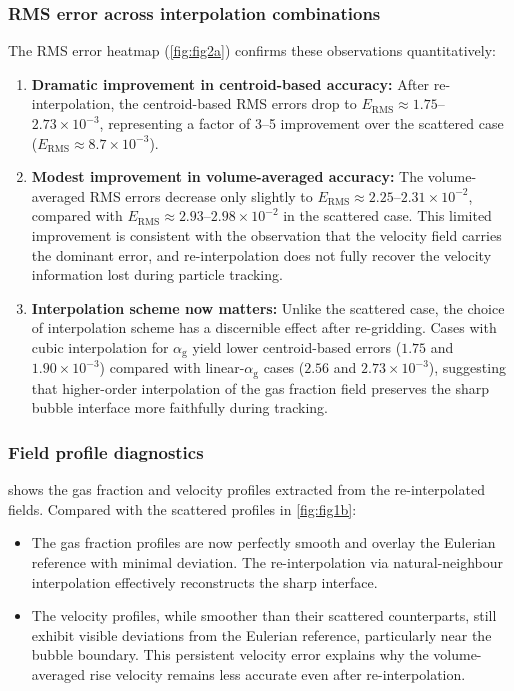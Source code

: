\documentclass[11pt,a4paper]{article}
\newcommand{\alphag}{\alpha_{\mathrm{g}}}
\newcommand{\ERMS}{E_{\mathrm{RMS}}}
\begin{document}
\subsubsection{RMS error across interpolation combinations}

The RMS error heatmap (\cref{fig:fig2a}) confirms these observations
quantitatively:

\begin{enumerate}[label=(\arabic*)]
  \item \textbf{Dramatic improvement in centroid-based accuracy:} After
    re-interpolation, the centroid-based RMS errors drop to
    $\ERMS \approx 1.75$--$2.73 \times 10^{-3}$, representing a factor of
    3--5 improvement over the scattered case
    ($\ERMS \approx 8.7 \times 10^{-3}$).
  \item \textbf{Modest improvement in volume-averaged accuracy:} The
    volume-averaged RMS errors decrease only slightly to
    $\ERMS \approx 2.25$--$2.31 \times 10^{-2}$, compared with
    $\ERMS \approx 2.93$--$2.98 \times 10^{-2}$ in the scattered case.
    This limited improvement is consistent with the observation that the
    velocity field carries the dominant error, and re-interpolation does not
    fully recover the velocity information lost during particle tracking.
  \item \textbf{Interpolation scheme now matters:} Unlike the scattered
    case, the choice of interpolation scheme has a discernible effect after
    re-gridding.  Cases with cubic interpolation for $\alphag$ yield lower
    centroid-based errors ($1.75$ and $1.90 \times 10^{-3}$) compared with
    linear-$\alphag$ cases ($2.56$ and $2.73 \times 10^{-3}$), suggesting
    that higher-order interpolation of the gas fraction field preserves the
    sharp bubble interface more faithfully during tracking.
\end{enumerate}

\subsubsection{Field profile diagnostics}

 shows the gas fraction and velocity profiles extracted from
the re-interpolated fields.  Compared with the scattered profiles in
\cref{fig:fig1b}:

\begin{itemize}
  \item The gas fraction profiles are now perfectly smooth and overlay the
    Eulerian reference with minimal deviation.  The re-interpolation via
    natural-neighbour interpolation effectively reconstructs the sharp
    interface.
  \item The velocity profiles, while smoother than their scattered
    counterparts, still exhibit visible deviations from the Eulerian
    reference, particularly near the bubble boundary.  This persistent
    velocity error explains why the volume-averaged rise velocity remains
    less accurate even after re-interpolation.
\end{itemize}
\end{document}
